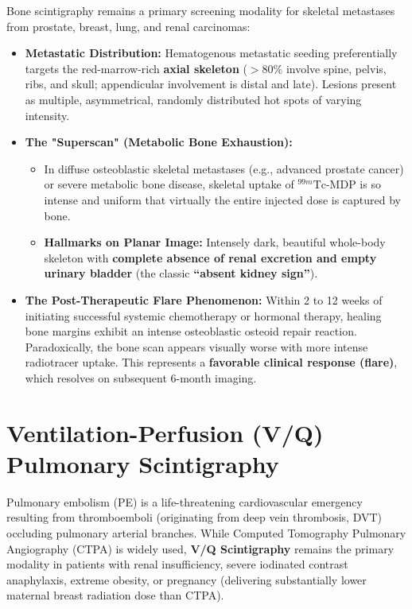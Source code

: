 \documentclass[11pt,a4paper]{article}
\begin{document}
Bone scintigraphy remains a primary screening modality for skeletal metastases from prostate, breast, lung, and renal carcinomas:
\begin{itemize}[leftmargin=*]
    \item \textbf{Metastatic Distribution:} Hematogenous metastatic seeding preferentially targets the red-marrow-rich \textbf{axial skeleton} ($> 80\%$ involve spine, pelvis, ribs, and skull; appendicular involvement is distal and late). Lesions present as multiple, asymmetrical, randomly distributed hot spots of varying intensity.
    \item \textbf{The "Superscan" (Metabolic Bone Exhaustion):}
    \begin{itemize}
        \item In diffuse osteoblastic skeletal metastases (e.g., advanced prostate cancer) or severe metabolic bone disease, skeletal uptake of $^{99m}\text{Tc}$-MDP is so intense and uniform that virtually the entire injected dose is captured by bone.
        \item \textbf{Hallmarks on Planar Image:} Intensely dark, beautiful whole-body skeleton with \textbf{complete absence of renal excretion and empty urinary bladder} (the classic \textbf{``absent kidney sign''}).
    \end{itemize}
    \item \textbf{The Post-Therapeutic Flare Phenomenon:} Within 2 to 12 weeks of initiating successful systemic chemotherapy or hormonal therapy, healing bone margins exhibit an intense osteoblastic osteoid repair reaction. Paradoxically, the bone scan appears visually worse with more intense radiotracer uptake. This represents a \textbf{favorable clinical response (flare)}, which resolves on subsequent 6-month imaging.
\end{itemize}

\newpage
\section{Ventilation-Perfusion (V/Q) Pulmonary Scintigraphy}

Pulmonary embolism (PE) is a life-threatening cardiovascular emergency resulting from thromboemboli (originating from deep vein thrombosis, DVT) occluding pulmonary arterial branches. While Computed Tomography Pulmonary Angiography (CTPA) is widely used, \textbf{V/Q Scintigraphy} remains the primary modality in patients with renal insufficiency, severe iodinated contrast anaphylaxis, extreme obesity, or pregnancy (delivering substantially lower maternal breast radiation dose than CTPA).
\end{document}
